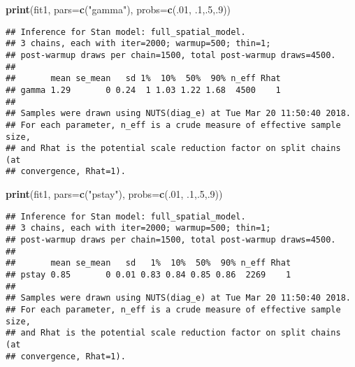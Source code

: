 \documentclass[11pt,]{article}
\newenvironment{Shaded}{\begin{snugshade}}{\end{snugshade}}
\newcommand{\KeywordTok}[1]{\textcolor[rgb]{0.13,0.29,0.53}{\textbf{#1}}}
\newcommand{\DataTypeTok}[1]{\textcolor[rgb]{0.13,0.29,0.53}{#1}}
\newcommand{\DecValTok}[1]{\textcolor[rgb]{0.00,0.00,0.81}{#1}}
\newcommand{\StringTok}[1]{\textcolor[rgb]{0.31,0.60,0.02}{#1}}
\newcommand{\OperatorTok}[1]{\textcolor[rgb]{0.81,0.36,0.00}{\textbf{#1}}}
\newcommand{\NormalTok}[1]{#1}
\begin{document}
\begin{Shaded}
\begin{Highlighting}[]
\KeywordTok{print}\NormalTok{(fit1, }\DataTypeTok{pars=}\KeywordTok{c}\NormalTok{(}\StringTok{"gamma"}\NormalTok{), }\DataTypeTok{probs=}\KeywordTok{c}\NormalTok{(.}\DecValTok{01}\NormalTok{, .}\DecValTok{1}\NormalTok{,.}\DecValTok{5}\NormalTok{,.}\DecValTok{9}\NormalTok{))}
\end{Highlighting}
\end{Shaded}

\begin{verbatim}
## Inference for Stan model: full_spatial_model.
## 3 chains, each with iter=2000; warmup=500; thin=1; 
## post-warmup draws per chain=1500, total post-warmup draws=4500.
## 
##       mean se_mean   sd 1%  10%  50%  90% n_eff Rhat
## gamma 1.29       0 0.24  1 1.03 1.22 1.68  4500    1
## 
## Samples were drawn using NUTS(diag_e) at Tue Mar 20 11:50:40 2018.
## For each parameter, n_eff is a crude measure of effective sample size,
## and Rhat is the potential scale reduction factor on split chains (at 
## convergence, Rhat=1).
\end{verbatim}

\begin{Shaded}
\begin{Highlighting}[]
\KeywordTok{print}\NormalTok{(fit1, }\DataTypeTok{pars=}\KeywordTok{c}\NormalTok{(}\StringTok{"pstay"}\NormalTok{), }\DataTypeTok{probs=}\KeywordTok{c}\NormalTok{(.}\DecValTok{01}\NormalTok{, .}\DecValTok{1}\NormalTok{,.}\DecValTok{5}\NormalTok{,.}\DecValTok{9}\NormalTok{))}
\end{Highlighting}
\end{Shaded}

\begin{verbatim}
## Inference for Stan model: full_spatial_model.
## 3 chains, each with iter=2000; warmup=500; thin=1; 
## post-warmup draws per chain=1500, total post-warmup draws=4500.
## 
##       mean se_mean   sd   1%  10%  50%  90% n_eff Rhat
## pstay 0.85       0 0.01 0.83 0.84 0.85 0.86  2269    1
## 
## Samples were drawn using NUTS(diag_e) at Tue Mar 20 11:50:40 2018.
## For each parameter, n_eff is a crude measure of effective sample size,
## and Rhat is the potential scale reduction factor on split chains (at 
## convergence, Rhat=1).
\end{verbatim}

\begin{Shaded}
\end{Shaded}
\end{document}
